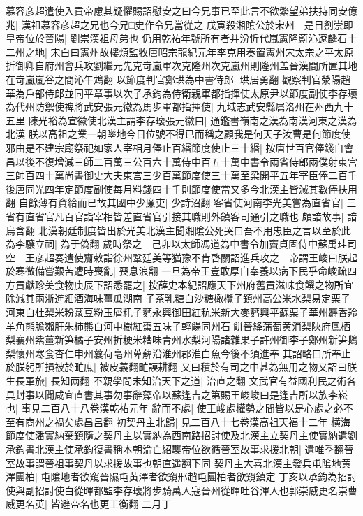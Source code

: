 慕容彦超遣使入貢帝慮其疑懼賜詔慰安之曰今兄事已至此言不欲繁望弟扶持同安億兆|{
	漢祖慕容彦超之兄也今兄□史作令兄當從之}
戊寅殺湘隂公於宋州　是日劉崇即皇帝位於晉陽|{
	劉崇漢祖母弟也}
仍用乾祐年號所有者并汾忻代嵐憲隆蔚沁遼麟石十二州之地|{
	宋白曰憲州故樓煩監牧唐昭宗龍紀元年李克用奏置憲州宋太宗之平太原折御卿自府州會兵攻劉繼元先克岢嵐軍次克隆州次克嵐州則隆州盖晉漢間所置其地在岢嵐嵐谷之間沁午鴆翻}
以節度判官鄭珙為中書侍郎|{
	珙居勇翻}
觀察判官滎陽趙華為戶部侍郎並同平章事以次子承鈞為侍衛親軍都指揮使太原尹以節度副使李存瓌為代州防禦使禆將武安張元徽為馬步軍都指揮使|{
	九域志武安縣属洛州在州西九十五里}
陳光裕為宣徽使北漢主謂李存瓌張元徽曰|{
	通鑑書嶺南之漢為南漢河東之漢為北漢}
朕以高祖之業一朝墜地今日位號不得已而稱之顧我是何天子汝曹是何節度使邪由是不建宗廟祭祀如家人宰相月俸止百緡節度使止三十緡|{
	按唐世百官俸錢自會昌以後不復增減三師二百萬三公百六十萬侍中百五十萬中書令兩省侍郎兩僕射東宫三師百四十萬尚書御史大夫東宫三少百萬節度使三十萬至梁開平五年宰臣俸二百千後唐同光四年定節度副使每月料錢四十千則節度使當又多今北漢主皆減其數俸扶用翻}
自餘薄有資給而已故其國中少廉吏|{
	少詩沼翻}
客省使河南李光美嘗為直省官|{
	三省有直省官凡百官詣宰相皆差直省官引接其職則外鎮客司通引之職也}
頗諳故事|{
	諳烏含翻}
北漢朝廷制度皆出於光美北漢主聞湘隂公死哭曰吾不用忠臣之言以至於此為李驤立祠|{
	為于偽翻}
歲時祭之　己卯以太師馮道為中書令加竇貞固侍中蘇禹珪司空　王彦超奏遣使齎敕詣徐州鞏廷美等猶豫不肯啓關詔進兵攻之　帝謂王峻曰朕起於寒微備嘗艱苦遭時喪亂|{
	喪息浪翻}
一旦為帝王豈敢厚自奉養以病下民乎命峻疏四方貢獻珍美食物庚辰下詔悉罷之|{
	按薛史本紀詔應天下州府舊貢滋味食饌之物所宜除減其兩浙進細酒海味薑瓜湖南子茶乳糖白沙糖橄欖子鎮州高公米水梨易定栗子河東白杜梨米粉菉豆粉玉屑籸子麫永興御田紅秔米新大麥麫興平蘇栗子華州麝香羚羊角熊膽獺肝朱柿熊白河中樹紅棗五味子輕餳同州石餅晉絳蒲萄黄消梨陜府鳳栖梨襄州紫薑新笋橘子安州折粳米糟味青州水梨河陽諸雜果子許州御李子鄭州新笋鵝梨懷州寒食杏仁申州蘘荷亳州萆薢沿淮州郡淮白魚今後不須進奉}
其詔略曰所奉止於朕躬所損被於甿庶|{
	被皮義翻甿謨耕翻}
又曰積於有司之中甚為無用之物又詔曰朕生長軍旅|{
	長知兩翻}
不親學問未知治天下之道|{
	治直之翻}
文武官有益國利民之術各具封事以聞咸宜直書其事勿事辭藻帝以蘇逢吉之第賜王峻峻曰是逢吉所以族李崧也|{
	事見二百八十八卷漢乾祐元年}
辭而不處|{
	使王峻處權勢之間皆以是心處之必不至有商州之禍矣處昌呂翻}
初契丹主北歸|{
	見二百八十七卷漢高祖天福十二年}
横海節度使潘實納棄鎮隨之契丹主以實納為西南路招討使及北漢主立契丹主使實納遺劉承鈞書北漢主使承鈞復書稱本朝淪亡紹襲帝位欲循晉室故事求援北朝|{
	遺唯季翻晉室故事謂晉祖事契丹以求援故事也朝直遥翻下同}
契丹主大喜北漢主發兵屯隂地黄澤團柏|{
	屯隂地者欲窺晉隰屯黄澤者欲窺邢趙屯團柏者欲窺鎮定}
丁亥以承鈞為招討使與副招討使白從暉都監李存瓌將步騎萬人寇晉州從暉吐谷渾人也郭崇威更名崇曹威更名英|{
	皆避帝名也更工衡翻}
二月丁

